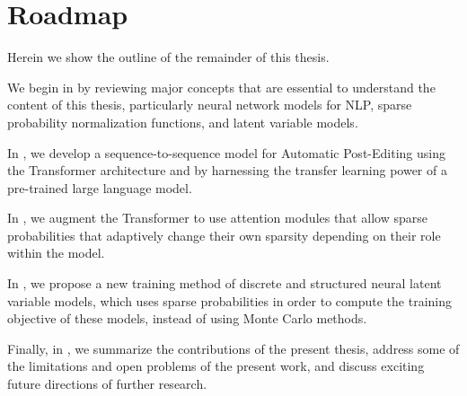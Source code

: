 \section{Roadmap}
\label{sec:int_roadmap}

Herein we show the outline of the remainder of this thesis.

We begin in  by reviewing major concepts
that are essential to understand the content of this thesis,
particularly neural network models for NLP, sparse probability
normalization functions, and latent variable models.

In , we develop a sequence-to-sequence model for
Automatic Post-Editing using the Transformer architecture and by
harnessing the transfer learning power of a pre-trained large
language model.

In , we augment the Transformer to use
attention modules that allow sparse probabilities that adaptively
change their own sparsity depending on their role within the model.

In , we propose a new training method of
discrete and structured neural latent variable models, which uses
sparse probabilities in order to compute the training objective of
these models, instead of using Monte Carlo methods.

Finally, in , we summarize the
contributions of the present thesis, address some of the limitations
and open problems of the present work, and discuss exciting future
directions of further research.
